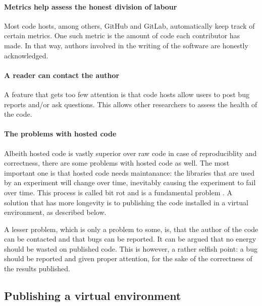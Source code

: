\paragraph{Metrics help assess the honest division of labour}

Most code hosts, among others, GitHub and GitLab,
automatically keep track of certain metrics.
One such metric is the amount of code each contributor has made.
In that way, authors involved in the writing of the software
are honestly acknowledged.

\paragraph{A reader can contact the author}

A feature that gets too few attention is that code hosts
allow users to post bug reports and/or ask questions.
This allows other researchers to assess the health
of the code.

\paragraph{The problems with hosted code}

Albeith hosted code is vastly superior over raw code
in case of reproduciblity and correctness,
there are some problems with hosted code as well.
The most important one is that hosted code needs maintanance:
the libraries that are used by an experiment
will change over time, inevitably causing the experiment to fail
over time. This process is called bit rot and is a fundamental
problem . A solution that has more 
longevity is to publishing the code installed in a virtual environment,
as described below.

A lesser problem, which is only a problem to some, is, that
the author of the code can be contacted and that bugs can be reported.
It can be argued that no energy should be wasted on published code.
This is however, a rather selfish point: a bug should be reported and
given proper attention, for the sake of the correctness of the 
results published. 

\subsection{Publishing a virtual environment}

